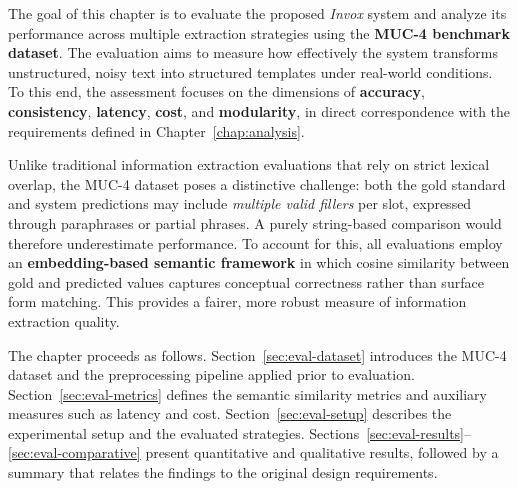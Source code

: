 The goal of this chapter is to evaluate the proposed \textit{Invox} system and analyze its performance across multiple extraction strategies using the \textbf{MUC-4 benchmark dataset}. The evaluation aims to measure how effectively the system transforms unstructured, noisy text into structured templates under real-world conditions. To this end, the assessment focuses on the dimensions of \textbf{accuracy}, \textbf{consistency}, \textbf{latency}, \textbf{cost}, and \textbf{modularity}, in direct correspondence with the requirements defined in Chapter~\ref{chap:analysis}.

Unlike traditional information extraction evaluations that rely on strict lexical overlap, the MUC-4 dataset poses a distinctive challenge: both the gold standard and system predictions may include \textit{multiple valid fillers} per slot, expressed through paraphrases or partial phrases. A purely string-based comparison would therefore underestimate performance. To account for this, all evaluations employ an \textbf{embedding-based semantic framework} in which cosine similarity between gold and predicted values captures conceptual correctness rather than surface form matching. This provides a fairer, more robust measure of information extraction quality.

The chapter proceeds as follows. Section~\ref{sec:eval-dataset} introduces the MUC-4 dataset and the preprocessing pipeline applied prior to evaluation. Section~\ref{sec:eval-metrics} defines the semantic similarity metrics and auxiliary measures such as latency and cost. Section~\ref{sec:eval-setup} describes the experimental setup and the evaluated strategies. Sections~\ref{sec:eval-results}--\ref{sec:eval-comparative} present quantitative and qualitative results, followed by a summary that relates the findings to the original design requirements.











